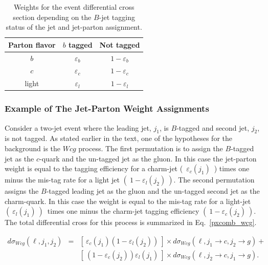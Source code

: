 \begin{table}[!h!tbp]
\begin{center}
\caption{Weights for the event differential cross section
depending on the $B$-jet tagging status of the jet and jet-parton
assignment.}
\label{jp}
\begin{tabular}{c|cc}
Parton flavor  &     $b$ tagged    &      Not tagged       \\
\hline
$b$            & $\varepsilon_{b}$ &  $1-\varepsilon_{b}$  \\
$c$            & $\varepsilon_{c}$ &  $1-\varepsilon_{c}$  \\
light          & $\varepsilon_{l}$ &  $1-\varepsilon_{l}$
\end{tabular}
\vspace{-0.1 in}
\end{center}
\end{table}

\subsubsection{Example of The Jet-Parton Weight Assignments}

Consider a two-jet event where the leading jet, $j_{1}$, is $B$-tagged and second jet, $j_{2}$, is not tagged. As stated earlier in the text, one of the hypotheses for the background is the $Wcg$ process. The first permutation is to assign the $B$-tagged jet as the $c$-quark and the un-tagged jet as the gluon. In this case the jet-parton weight is equal to the tagging efficiency for a charm-jet (~$\varepsilon_{c}(j_{1})$~) times one minus the mis-tag rate for a light jet $(~1-\varepsilon_{l}(j_{2})~)$. The second permutation assigns the $B$-tagged leading jet as the gluon and the un-tagged second jet as the charm-quark. In this case the weight is equal to the mis-tag rate for a light-jet $(~\varepsilon_{l}(j_{1})~)$~times one minus the charm-jet tagging efficiency $(~1-\varepsilon_{c}(j_{2})~)$. The total differential cross for this process is summarized in Eq.~\ref{pxcomb_wcg}.

\begin{eqnarray}
\label{pxcomb_wcg}
d\sigma_{Wcg}(\ell, j_1, j_2)
&=& \left[~\varepsilon_{c}(j_1)(1-\varepsilon_{l}(j_2))~\right] \times
d\sigma_{Wcg}(\ell, j_1 {\rightarrow} c, j_2 {\rightarrow} g) + \nonumber \\ 
& & \left[~(1-\varepsilon_{c}(j_2))\varepsilon_{l}(j_1)~\right] \times
d\sigma_{Wcg}(\ell, j_2 {\rightarrow} c, j_1 {\rightarrow} g).
\end{eqnarray}


